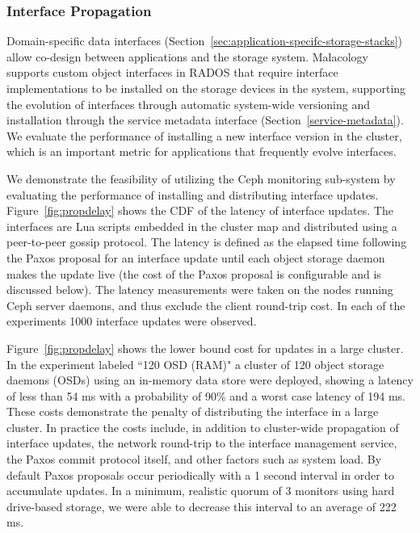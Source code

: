 \subsubsection{Interface Propagation}

Domain-specific data interfaces
(Section~\ref{sec:application-specifc-storage-stacks}) allow co-design between
applications and the storage system. Malacology supports custom object
interfaces in RADOS that require interface implementations to be installed on
the storage devices in the system, supporting the evolution of interfaces
through automatic system-wide versioning and installation through the service
metadata interface (Section~\ref{service-metadata}). We evaluate the
performance of installing a new interface version in the cluster, which is an
important metric for applications that frequently evolve interfaces.

We demonstrate the feasibility of utilizing the Ceph monitoring sub-system by
evaluating the performance of installing and distributing interface updates.
Figure~\ref{fig:propdelay} shows the CDF of the latency of interface updates.
The interfaces are Lua scripts embedded in the cluster map and distributed
using a peer-to-peer gossip protocol.  The latency is defined as the elapsed
time following the Paxos proposal for an interface update until each object storage daemon makes
the update live (the cost of the Paxos proposal is configurable and is
discussed below). The latency measurements were taken on the nodes running Ceph
server daemons, and thus exclude the client round-trip cost. In each of the
experiments 1000 interface updates were observed.

Figure~\ref{fig:propdelay} shows the lower bound cost for updates in a large
cluster. In the experiment labeled ``120 OSD (RAM)" a cluster of 120 object storage daemons (OSDs)
using an in-memory data store were deployed, showing a
latency of less than 54 ms with a probability of 90\% and a worst case latency
of 194 ms. These costs demonstrate the penalty of distributing the interface in
a large cluster. In practice the costs include, in addition to cluster-wide
propagation of interface updates, the network round-trip to the interface
management service, the Paxos commit protocol itself, and other factors such as
system load. By default Paxos proposals occur periodically with a 1 second
interval in order to accumulate updates. In a minimum, realistic quorum of 3
monitors using hard drive-based storage, we were able to decrease this interval to an
average of 222 ms.

